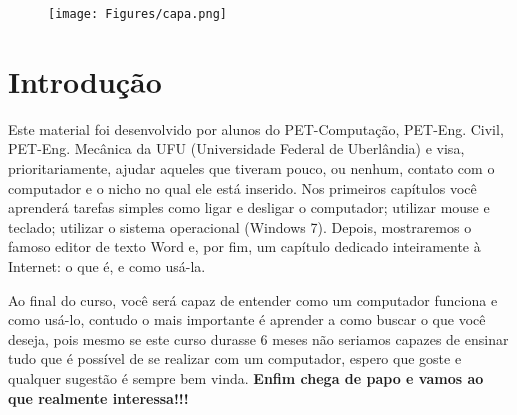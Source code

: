 \documentclass[hidelinks,12pt]{article}
\newcommand{\bigicon}[1]{\texttt{[image: \#1]}}
\newcommand{\iconb}[1]{\texttt{[image: \#1]}}
\begin{document}
\pagestyle{fancy}


\lhead{\bigicon{Figures/ufu}}
\rhead{\bigicon{Figures/facom}}
\lfoot{}
\cfoot{}
\rfoot{}
\vspace*{1cm}
\begin{figure}[!h]
	\centering
	\texttt{[image: Figures/capa.png]}
\end{figure}


\newpage
\fancyhead[C]{}
\fancyhead[R]{\iconb{Figures/comppet}}
\fancyhead[L]{\leftmark}
\fancyfoot{}
\fancyfoot[C]{\hspace{3.0cm}\thepage}


\tableofcontents
\listoffigures

{\let\thefootnote\relax{}}

{\let\thefootnote\relax{}}

{\let\thefootnote\relax{}}

\newpage

\section{Introdução}

 Este material foi desenvolvido por alunos do PET-Computação, PET-Eng. Civil, PET-Eng. Mecânica da UFU (Universidade Federal de Uberlândia) e visa, prioritariamente, ajudar aqueles que tiveram pouco, ou nenhum, contato com o computador e o nicho no qual ele está inserido. Nos primeiros capítulos você aprenderá tarefas simples como ligar e desligar o computador; utilizar mouse e teclado; utilizar o sistema operacional (Windows 7). Depois, mostraremos o famoso editor de texto Word e, por fim, um capítulo dedicado inteiramente à Internet: o que é, e como usá-la.
 
 Ao final do curso, você será capaz de entender como um computador funciona e como usá-lo, contudo o mais importante é aprender a como buscar o que você deseja, pois mesmo se este curso durasse 6 meses não seriamos capazes de ensinar tudo que é possível de se realizar com um computador, espero que goste e qualquer sugestão é sempre bem vinda. \textbf{Enfim chega de papo e vamos ao que realmente interessa!!!}
\end{document}
